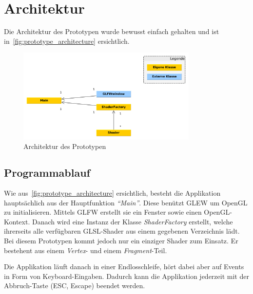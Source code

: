 
\section{Architektur}
\label{sec:architecture}

Die Architektur des Prototypen wurde bewusst einfach gehalten und ist
in~\autoref{fig:prototype_architecture} ersichtlich.

\begin{figure}[H]
    \centering
    \includegraphics[width=0.8\textwidth]{img/prototype_class_diagram.pdf}
    \caption{Architektur des Prototypen\protect\footnotemark}\label{fig:prototype_architecture}
\end{figure}

\subsection{Programmablauf}
\label{subsec:program_sequence}

Wie aus~\autoref{fig:prototype_architecture} ersichtlich, besteht die
Applikation hauptsächlich aus der Hauptfunktion \textit{``Main''}. Diese
benützt GLEW um OpenGL zu initialisieren. Mittels GLFW erstellt sie ein
Fenster sowie einen OpenGL-Kontext. Danach wird eine Instanz der Klasse
\textit{ShaderFactory} erstellt, welche ihrerseits alle verfügbaren
GLSL-Shader aus einem gegebenen Verzeichnis lädt. Bei diesem Prototypen
kommt jedoch nur ein einziger Shader zum Einsatz. Er bestehent aus einem
\textit{Vertex}- und einem \textit{Fragment}-Teil.

Die Applikation läuft danach in einer Endlosschleife, hört dabei aber
auf Events in Form von Keyboard-Eingaben. Dadurch kann die Applikation
jederzeit mit der Abbruch-Taste (ESC, Escape) beendet werden.

